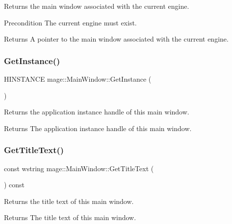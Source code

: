 Returns the main window associated with the current engine.

\begin{DoxyPrecond}{Precondition}
The current engine must exist. 
\end{DoxyPrecond}
\begin{DoxyReturn}{Returns}
A pointer to the main window associated with the current engine. 
\end{DoxyReturn}
\hypertarget{classmage_1_1_main_window_ac981116ddb31a0911ee849161eb1f27d}{}\label{classmage_1_1_main_window_ac981116ddb31a0911ee849161eb1f27d} 
\subsubsection{\texorpdfstring{Get\+Instance()}{GetInstance()}}
{\footnotesize\ttfamily H\+I\+N\+S\+T\+A\+N\+CE mage\+::\+Main\+Window\+::\+Get\+Instance (\begin{DoxyParamCaption}{ }\end{DoxyParamCaption})\hspace{0.3cm}{\ttfamily [noexcept]}}

Returns the application instance handle of this main window.

\begin{DoxyReturn}{Returns}
The application instance handle of this main window. 
\end{DoxyReturn}
\hypertarget{classmage_1_1_main_window_a16ea3780659e00c8e4732b518c7c4a1e}{}\label{classmage_1_1_main_window_a16ea3780659e00c8e4732b518c7c4a1e} 
\subsubsection{\texorpdfstring{Get\+Title\+Text()}{GetTitleText()}}
{\footnotesize\ttfamily const wstring mage\+::\+Main\+Window\+::\+Get\+Title\+Text (\begin{DoxyParamCaption}{ }\end{DoxyParamCaption}) const\hspace{0.3cm}{\ttfamily [noexcept]}}

Returns the title text of this main window.

\begin{DoxyReturn}{Returns}
The title text of this main window. 
\end{DoxyReturn}
\hypertarget{classmage_1_1_main_window_ab9409b69a6358e3faa3ee0cfd41f6a46}{}\label{classmage_1_1_main_window_ab9409b69a6358e3faa3ee0cfd41f6a46} 
